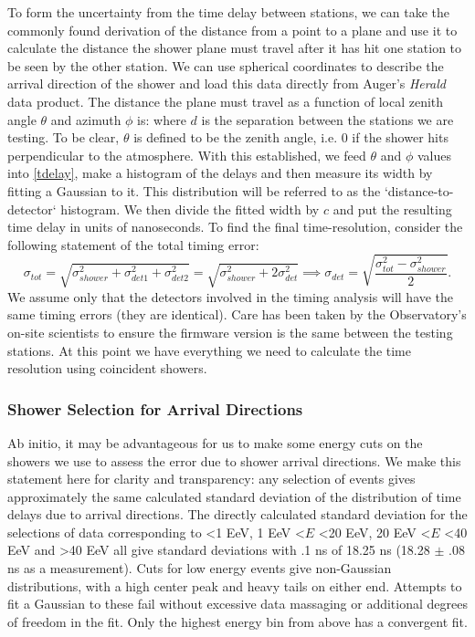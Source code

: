 To form the uncertainty from the time delay between stations, we can take the commonly found derivation of the distance from a point to a plane and use it to calculate the distance the shower plane must travel after it has hit one station to be seen by the other station. We can use spherical coordinates to describe the arrival direction of the shower and load this data directly from Auger's \textit{Herald} data product. The distance the plane must travel as a function of local zenith angle $\theta$ and azimuth $\phi$ is:
where $d$ is the separation between the stations we are testing. To be clear, $\theta$ is defined to be the zenith angle, i.e. 0 if the shower hits perpendicular to the atmosphere. With this established, we feed $\theta$ and $\phi$ values into \autoref{tdelay}, make a histogram of the delays and then measure its width by fitting a Gaussian to it. This distribution will be referred to as the `distance-to-detector` histogram. We then divide the fitted width by $c$ and put the resulting time delay in units of nanoseconds. To find the final time-resolution, consider the following statement of the total timing error:
$$
\sigma_{tot}=\sqrt{\sigma_{shower}^2+\sigma_{det1}^2+\sigma_{det2}^2}=\sqrt{\sigma_{shower}^2+2\sigma_{det}^2}\implies\sigma_{det}=\sqrt{\frac{\sigma_{tot}^2-\sigma_{shower}^2}{2}}.
$$
We assume only that the detectors involved in the timing analysis will have the same timing errors (they are identical). Care has been taken by the Observatory's on-site scientists to ensure the firmware version is the same between the testing stations. At this point we have everything we need to calculate the time resolution using coincident showers.
\subsubsection{Shower Selection for Arrival Directions}
\label{justify}
Ab initio, it may be advantageous for us to make some energy cuts on the showers we use to assess the error due to shower arrival directions. We make this statement here for clarity and transparency: any selection of events gives approximately the same calculated standard deviation of the distribution of time delays due to arrival directions. The directly calculated standard deviation for the selections of data corresponding to \textless 1 EeV, 1 EeV \textless $E$ \textless 20 EeV, 20 EeV \textless $E$ \textless 40 EeV and  \textgreater 40 EeV all give standard deviations with .1 ns of 18.25 ns (18.28 $\pm$ .08 ns as a measurement).  Cuts for low energy events give non-Gaussian distributions, with a high center peak and heavy tails on either end. Attempts to fit a Gaussian to these fail without excessive data massaging or additional degrees of freedom in the fit. Only the highest energy bin from above has a convergent fit. 


